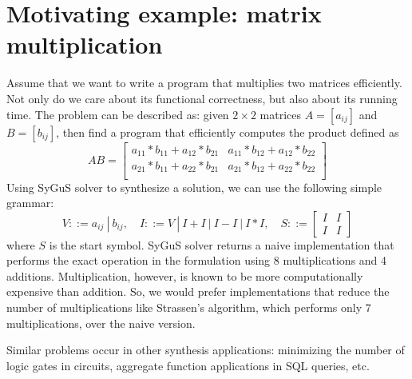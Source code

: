 \section{Motivating example: matrix multiplication}
\label{sec:example}

Assume that we want to write a program that multiplies two matrices efficiently. 
%
Not only do we care about its functional correctness, but also about its running time.
%
The problem can be described as: given $2 \times 2$ matrices $A = [a_{ij}]$ and $B = [b_{ij}]$, then find a program that efficiently computes the product defined as
%
\begin{equation}
    AB =
\begin{bmatrix}
a_{11} * b_{11} + a_{12} * b_{21} &
a_{11} * b_{12} + a_{12} * b_{22} \\
a_{21} * b_{11} + a_{22} * b_{21} &
a_{21} * b_{12} + a_{22} * b_{22} \\
\end{bmatrix}
\label{eqn:matrix-mul}
\end{equation}
%
%
Using SyGuS solver to synthesize a solution, we can use the following simple grammar:
%
\[
V ::= a_{ij} \ | \ b_{ij}, \quad
I ::= V \ | \ I + I \ | \ I - I \ | \ I * I, \quad
S ::=
\begin{bmatrix} I & I \\
I & I
\end{bmatrix}
\]
%
where $S$ is the start symbol. 
%
SyGuS solver returns a naive implementation that performs the exact operation in the formulation using 8 multiplications and 4 additions.
%
Multiplication, however, is known to be more computationally expensive than addition.
%
So, we would prefer implementations that reduce the number of multiplications like Strassen's algorithm, which performs only 7 multiplications, over the naive version.
%

Similar problems occur in other synthesis applications: minimizing the number of logic gates in circuits, aggregate function applications in SQL queries, etc.
